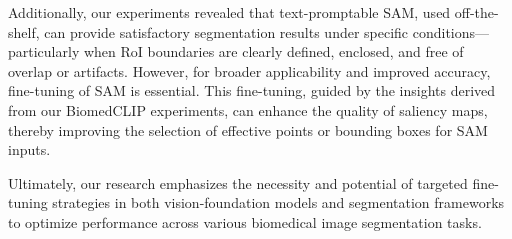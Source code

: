 \documentclass[./dissertation.tex]{subfiles}
\begin{document}
Additionally, our experiments revealed that text-promptable SAM, used off-the-shelf, can provide satisfactory segmentation results under specific conditions—particularly when RoI boundaries are clearly defined, enclosed, and free of overlap or artifacts. However, for broader applicability and improved accuracy, fine-tuning of SAM is essential. This fine-tuning, guided by the insights derived from our BiomedCLIP experiments, can enhance the quality of saliency maps, thereby improving the selection of effective points or bounding boxes for SAM inputs.

Ultimately, our research emphasizes the necessity and potential of targeted fine-tuning strategies in both vision-foundation models and segmentation frameworks to optimize performance across various biomedical image segmentation tasks.
\end{document}
